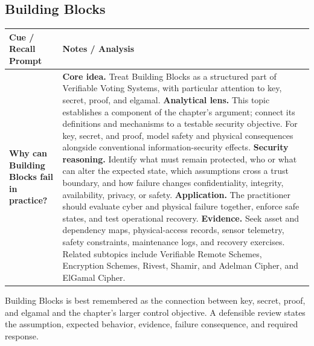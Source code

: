 \documentclass[11pt]{article}
\newcommand{\CornellHeader}{%
\rowcolor{Navy}\color{white}\bfseries Cue / Recall Prompt & \color{white}\bfseries Notes / Analysis\\\hline}
\newcommand{\CornellRow}[2]{%
\cellcolor{CueGray}\RaggedRight\textbf{#1} & \RaggedRight #2\\\hline}
\begin{document}
\subsection*{Building Blocks}
\begin{longtable}{>{\RaggedRight\arraybackslash}p{}|>{\RaggedRight\arraybackslash}p{}}
\CornellHeader
\CornellRow{Why can Building Blocks fail in practice?}{\textbf{Core idea.} Treat Building Blocks as a structured part of Verifiable Voting Systems, with particular attention to key, secret, proof, and elgamal. \textbf{Analytical lens.} This topic establishes a component of the chapter's argument; connect its definitions and mechanisms to a testable security objective. For key, secret, and proof, model safety and physical consequences alongside conventional information-security effects. \textbf{Security reasoning.} Identify what must remain protected, who or what can alter the expected state, which assumptions cross a trust boundary, and how failure changes confidentiality, integrity, availability, privacy, or safety. \textbf{Application.} The practitioner should evaluate cyber and physical failure together, enforce safe states, and test operational recovery. \textbf{Evidence.} Seek asset and dependency maps, physical-access records, sensor telemetry, safety constraints, maintenance logs, and recovery exercises. Related subtopics include Verifiable Remote Schemes, Encryption Schemes, Rivest, Shamir, and Adelman Cipher, and ElGamal Cipher.}
\end{longtable}
\begin{topicsummary}
Building Blocks is best remembered as the connection between key, secret, proof, and elgamal and the chapter's larger control objective. A defensible review states the assumption, expected behavior, evidence, failure consequence, and required response.
\end{topicsummary}
\end{document}
